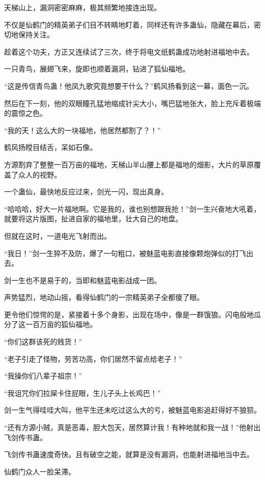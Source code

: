 
\begin{this_body}

天梯山上，漏洞密密麻麻，极其频繁地接连出现。

不仅是仙鹤门的精英弟子们目不转睛地盯着，同样还有许多蛊仙，隐藏在幕后，密切地保持关注。

趁着这个功夫，方正又连续试了三次，终于将电文纸鹤蛊成功地射进福地中去。

一只青鸟，展翅飞来，旋即也顺着漏洞，钻进了狐仙福地。

“这是传信青鸟蛊！他凤九歌究竟想要干什么？”鹤风扬看到这一幕，面色一沉。

然后在下一刻，他的双眼瞳孔猛地缩成针尖大小，嘴巴猛地张大，脸上充斥着极端的震惊之色。

“我的天！这么大的一块福地，他居然都割了？！”

鹤风扬瞠目结舌，呆如石像。

方源割弃了整整一百万亩的福地，天梯山半山腰上都是福地的烟影，大片的草原覆盖了众人的视野。

一个蛊仙，最快地反应过来，剑光一闪，现出真身。

“哈哈哈，好大一片福地啊。它是我的，谁也别想跟我抢！”剑一生兴奋地大吼着，就要将这片版图，扯进自家的福地里，壮大自己的地盘。

但就在这时，一道电光飞射而出。

“我日！”剑一生猝不及防，爆了一句粗口，被魅蓝电影直接像颗炮弹似的打飞出去。

剑一生也不是易于的，当即和魅蓝电影战成一团。

声势猛烈，地动山摇，看得仙鹤门的一宗精英弟子全都傻了眼。

更令他们惊愕的是，紧接着十多个身影，出现在场中，像是一群饿狼。闪电般地瓜分了这一百万亩的狐仙福地。

“你们这群该死的贱货！”

“老子引走了怪物，劳苦功高，你们居然不留点给老子！”

“我操你们八辈子祖宗！”

“我诅咒你们拉屎卡住屁眼，生儿子头上长鸡巴！”

剑一生气得哇哇大叫，他平生还未吃过这么大的亏，被魅蓝电影追赶得好不狼狈。

“还有方源小贼，真是恶毒，胆大包天，居然算计我！有种地就和我一战！”他射出飞剑传书蛊。

飞剑传书蛊速度奇快。且有破空之能，就算是没有漏洞，也能射进福地当中去。

仙鹤门众人一脸呆滞。


\end{this_body}
